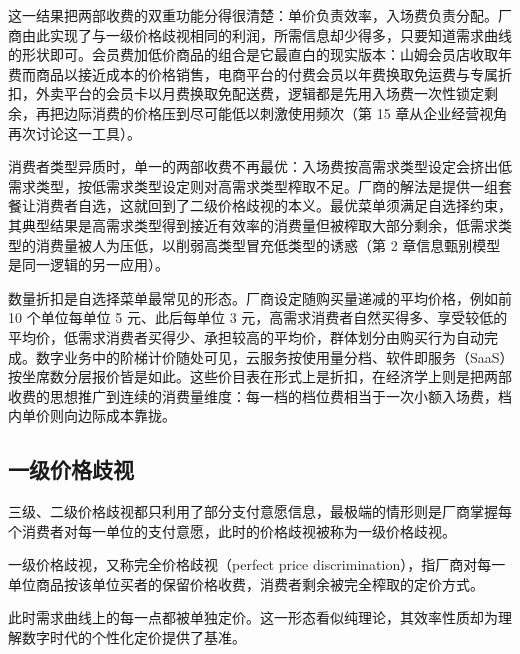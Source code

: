 这一结果把两部收费的双重功能分得很清楚：单价负责效率，入场费负责分配。厂商由此实现了与一级价格歧视相同的利润，所需信息却少得多，只要知道需求曲线的形状即可。会员费加低价商品的组合是它最直白的现实版本：山姆会员店收取年费而商品以接近成本的价格销售，电商平台的付费会员以年费换取免运费与专属折扣，外卖平台的会员卡以月费换取免配送费，逻辑都是先用入场费一次性锁定剩余，再把边际消费的价格压到尽可能低以刺激使用频次（第 15 章从企业经营视角再次讨论这一工具）。

消费者类型异质时，单一的两部收费不再最优：入场费按高需求类型设定会挤出低需求类型，按低需求类型设定则对高需求类型榨取不足。厂商的解法是提供一组套餐让消费者自选，这就回到了二级价格歧视的本义。最优菜单须满足自选择约束，其典型结果是高需求类型得到接近有效率的消费量但被榨取大部分剩余，低需求类型的消费量被人为压低，以削弱高类型冒充低类型的诱惑（第 2 章信息甄别模型是同一逻辑的另一应用）。

数量折扣是自选择菜单最常见的形态。厂商设定随购买量递减的平均价格，例如前 10 个单位每单位 5 元、此后每单位 3 元，高需求消费者自然买得多、享受较低的平均价，低需求消费者买得少、承担较高的平均价，群体划分由购买行为自动完成。数字业务中的阶梯计价随处可见，云服务按使用量分档、软件即服务（SaaS）按坐席数分层报价皆是如此。这些价目表在形式上是折扣，在经济学上则是把两部收费的思想推广到连续的消费量维度：每一档的档位费相当于一次小额入场费，档内单价则向边际成本靠拢。

\subsection{一级价格歧视}

三级、二级价格歧视都只利用了部分支付意愿信息，最极端的情形则是厂商掌握每个消费者对每一单位的支付意愿，此时的价格歧视被称为一级价格歧视。

\begin{definition}
一级价格歧视，又称完全价格歧视（perfect price discrimination），指厂商对每一单位商品按该单位买者的保留价格收费，消费者剩余被完全榨取的定价方式。
\end{definition}

此时需求曲线上的每一点都被单独定价。这一形态看似纯理论，其效率性质却为理解数字时代的个性化定价提供了基准。

